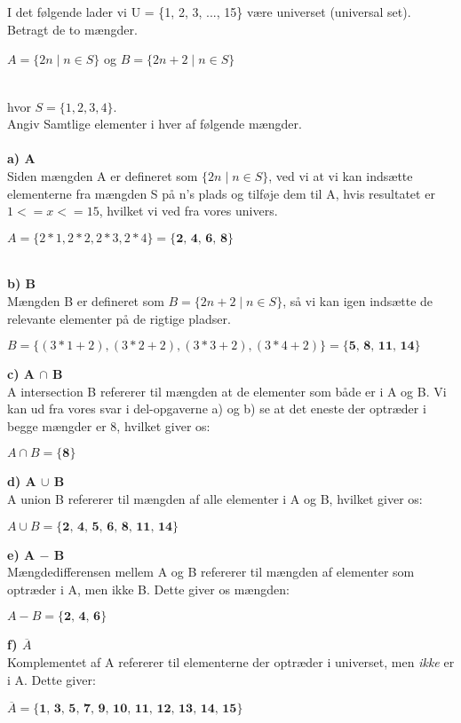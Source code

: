 \documentclass{article}
\begin{document}
\\
\\
I det følgende lader vi U = \{1, 2, 3, ..., 15\} være universet (universal set).
\\
Betragt de to mængder.
\begin{center}
    \( A = \{ 2n \mid n \in S \} \) og \( B = \{ 2n + 2 \mid n \in S \} \)
\end{center}
\\
hvor \(S = \{1, 2, 3, 4\}.\)
\\
Angiv Samtlige elementer i hver af følgende mængder.
\\
\\
\textbf{a) A}\\
Siden mængden A er defineret som \(\{ 2n \mid n \in S \}\), ved vi at vi kan indsætte elementerne fra mængden S på n's plads og tilføje dem til A, hvis resultatet er \(1 <= x <= 15\), hvilket vi ved fra vores univers.
\begin{center}
\(A = \{2*1, 2*2, 2*3, 2*4\} = \textbf{\{2, 4, 6, 8\}}\) \\
\end{center}
\\
\textbf{b) B}\\
Mængden B er defineret som \(B = \{2n + 2 \mid n \in S\}\), så vi kan igen indsætte de relevante elementer på de rigtige pladser. 
\begin{center}
    \(B = \{(3*1+2), (3*2+2), (3*3+2), (3*4+2)\} = \textbf{\{5, 8, 11, 14\}}\)
\end{center}
\textbf{c) A \(\cap\) B}\\
A intersection B refererer til mængden at de elementer som både er i A og B. Vi kan ud fra vores svar i del-opgaverne a) og b) se at det eneste der optræder i begge mængder er 8, hvilket giver os: 
\begin{center}
    \(A \cap B = \textbf{\{8\}}\) \\
\end{center}
\textbf{d) A \(\cup\) B}\\
A union B refererer til mængden af alle elementer i A og B, hvilket giver os: 
\begin{center}
    \(A \cup B = \textbf{\{2, 4, 5, 6, 8, 11, 14\}}\)
\end{center}
\textbf{e) A \( - \) B}\\
Mængdedifferensen mellem A og B refererer til mængden af elementer som optræder i A, men ikke B. Dette giver os mængden:
\begin{center}
    \(A - B = \textbf{\{2, 4, 6\}}\)
\end{center}
\textbf{f) \(\overline{A}\)} \\
Komplementet af A refererer til elementerne der optræder i universet, men \textit{ikke} er i A. Dette giver:
\begin{center}
    \(\overline{A} = \textbf{\{1, 3, 5, 7, 9, 10, 11, 12, 13, 14, 15\}}\)
\end{center}
\\
\\
\end{document}
